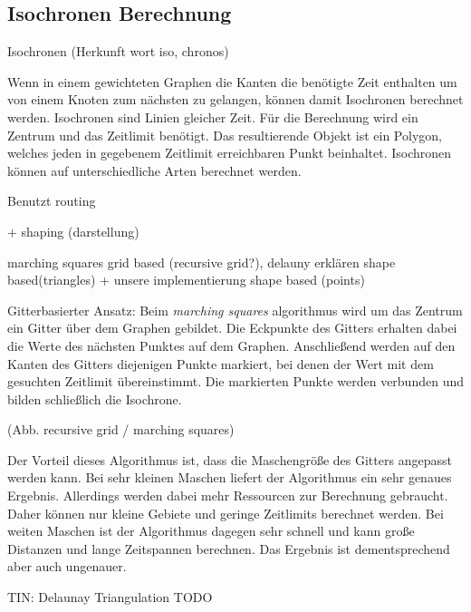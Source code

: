 \documentclass[10pt,a4paper]{article}
\begin{document}
\subsection{Isochronen Berechnung}

Isochronen (Herkunft wort iso, chronos)

Wenn in einem gewichteten Graphen die Kanten die benötigte Zeit enthalten um von einem Knoten zum nächsten zu gelangen, können damit Isochronen berechnet werden.
Isochronen sind Linien gleicher Zeit. Für die Berechnung wird ein Zentrum und das Zeitlimit benötigt. Das resultierende Objekt ist ein Polygon, welches jeden in gegebenem Zeitlimit erreichbaren Punkt beinhaltet.
Isochronen können auf unterschiedliche Arten berechnet werden. 

Benutzt routing

+ shaping (darstellung)

marching squares grid based (recursive grid?), delauny erklären shape based(triangles) + unsere implementierung shape based (points)

Gitterbasierter Ansatz:
Beim \textit{marching squares} algorithmus wird um das Zentrum ein Gitter über dem Graphen gebildet. Die Eckpunkte des Gitters erhalten dabei die Werte des nächsten Punktes auf dem Graphen. Anschließend werden auf den Kanten des Gitters diejenigen Punkte markiert, bei denen der Wert mit dem gesuchten Zeitlimit übereinstimmt. Die markierten Punkte werden verbunden und bilden schließlich die Isochrone.

(Abb. recursive grid / marching squares)

Der Vorteil dieses Algorithmus ist, dass die Maschengröße des Gitters angepasst werden kann. Bei sehr kleinen Maschen liefert der Algorithmus ein sehr genaues Ergebnis. Allerdings werden dabei mehr Ressourcen zur Berechnung gebraucht. Daher können nur kleine Gebiete und geringe Zeitlimits berechnet werden. Bei weiten Maschen ist der Algorithmus dagegen sehr schnell und kann große Distanzen und lange Zeitspannen berechnen. Das Ergebnis ist dementsprechend aber auch ungenauer.

TIN: Delaunay Triangulation
TODO
\end{document}
